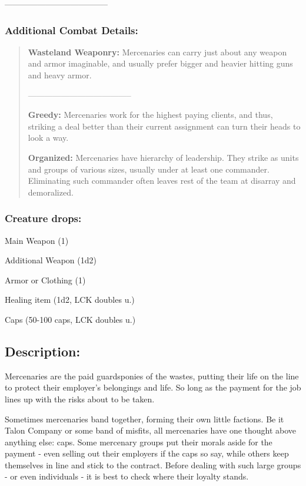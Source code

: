 \documentclass[11pt,a4paper,twocolumn]{book}
\begin{document}
	--------------------------------------
	
	\subsubsection*{Additional Combat Details:}
	\begin{verse}
		\textbf{Wasteland Weaponry:} Mercenaries can carry just about any weapon and armor imaginable, and usually prefer bigger and heavier hitting guns and heavy armor.
		
			--------------------------------------
		
		\textbf{Greedy:} Mercenaries work for the highest paying clients, and thus, striking a deal better than their current assignment can turn their heads to look a way.
		
		\textbf{Organized:} Mercenaries have hierarchy of leadership. They strike as units and groups of various sizes, usually under at least one commander. Eliminating such commander often leaves rest of the team at disarray and demoralized.

	\end{verse}
	
	\subsubsection*{Creature drops:}
	\begin{compactitem}
		\item Main Weapon (1)
		\item Additional Weapon (1d2)
		\item Armor or Clothing (1)
		\item Healing item (1d2, LCK doubles u.)
		\item Caps (50-100 caps, LCK doubles u.)
	\end{compactitem}
	
	\subsection*{Description:}
	Mercenaries are the paid guardsponies of the wastes, putting their life on the line to protect their employer's belongings and life. So long as the payment for the job lines up with the risks about to be taken.
	
	Sometimes mercenaries band together, forming their own little factions. Be it Talon Company or some band of misfits, all mercenaries have one thought above anything else: caps. Some mercenary groups put their morals aside for the payment - even selling out their employers if the caps so say, while others keep themselves in line and stick to the contract. Before dealing with such large groups - or even individuals - it is best to check where their loyalty stands.
	
\end{document}
